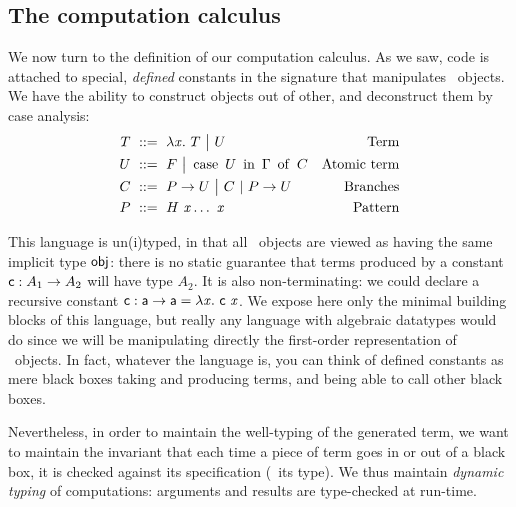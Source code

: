 \documentclass{llncs}
\begin{document}


\subsection{The computation calculus}
\label{sec:computational-calculus}

We now turn to the definition of our computation calculus. As we saw,
code is attached to special, \emph{defined} constants in the signature
that manipulates \LF\ objects. We have the ability to construct
objects out of other, and deconstruct them by case analysis:
\begin{align*}
  T &\ ::=\ 
  \lambda{\ensuremath{\text{\textit{x}}}}.\  T \ {\big|}\ 
  U & \text{Term} \\
  U &\ ::=\ 
  F \ {\big|}\ 
  \operatorname{case}\ {{U}\ \operatorname{in}\ {\Gamma}}\ \operatorname{of}\  C & \text{Atomic term}\\
  C &\ ::=\  {P}\to U \ {\big|}\ 
  C\ |\ {P}\to U & \text{Branches}\\
  P &\ ::=\ 
  {H}\  {\text{\textit{x}}} \ldots\ {\text{\textit{x}}} &\text{Pattern}
\end{align*}

This language is un(i)typed, in that all \LF\ objects are viewed as
having the same implicit type $\text{\textsf{obj}}$: there is no static
guarantee that terms produced by a constant $\text{\textsf{c}} : A_1\to A_2$ will
have type $A_2$. It is also non-terminating: we could declare a
recursive constant $\text{\textsf{c}} : \text{\textsf{a}}\to \text{\textsf{a}} = \lambda{\ensuremath{\text{\textit{x}}}}.\  {\text{\textsf{c}}}\ 
{\text{\textit{x}}}$. We expose here only the minimal building blocks of this
language, but really any language with algebraic datatypes would do
since we will be manipulating directly the first-order representation
of \LF\ objects. In fact, whatever the language is, you can think of
defined constants as mere black boxes taking and producing terms, and
being able to call other black boxes.

Nevertheless, in order to maintain the well-typing of the generated
term, we want to maintain the invariant that each time a piece of term
goes in or out of a black box, it is checked against its specification
(\ie\ its type). We thus maintain \emph{dynamic typing} of
computations: arguments and results are type-checked at run-time.
\end{document}
